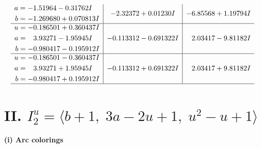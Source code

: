\documentclass[1p]{elsarticle_modified}
\theoremstyle{definition}
\begin{document}
$$\begin{array}{c|c|c}
\begin{aligned}
a &= -1.51964 - 0.31762 I \\
b &= -1.269680 + 0.070813 I\end{aligned}
 & -2.32372 + 0.01230 I & -6.85568 + 1.19794 I \\ \hline\begin{aligned}
u &= -0.186501 + 0.360437 I \\
a &= \phantom{-}3.93271 - 1.95945 I \\
b &= -0.980417 - 0.195912 I\end{aligned}
 & -0.113312 - 0.691322 I & \phantom{-}2.03417 - 9.81182 I \\ \hline\begin{aligned}
u &= -0.186501 - 0.360437 I \\
a &= \phantom{-}3.93271 + 1.95945 I \\
b &= -0.980417 + 0.195912 I\end{aligned}
 & -0.113312 + 0.691322 I & \phantom{-}2.03417 + 9.81182 I\\
 \hline 
 \end{array}$$\newpage\newpage\renewcommand{\arraystretch}{1}
\centering \section*{II. $I^u_{2}= \langle b+1,\;3 a-2 u+1,\;u^2- u+1 \rangle$}
\flushleft \textbf{(i) Arc colorings}\\
\end{document}
